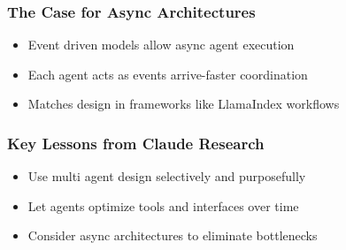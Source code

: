 \begin{frame}[fragile]\frametitle{The Case for Async Architectures}
    \begin{itemize}
        \item Event driven models allow async agent execution
        \item Each agent acts as events arrive-faster coordination
        \item Matches design in frameworks like LlamaIndex workflows
    \end{itemize}
\end{frame}

\begin{frame}[fragile]\frametitle{Key Lessons from Claude Research}
    \begin{itemize}
        \item Use multi agent design selectively and purposefully
        \item Let agents optimize tools and interfaces over time
        \item Consider async architectures to eliminate bottlenecks
    \end{itemize}
\end{frame}
